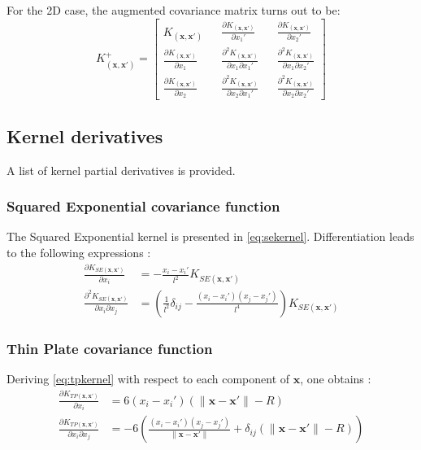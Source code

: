 \documentclass[10pt,a4paper,twocolumn]{article}
\begin{document}
For the 2D case, the augmented covariance matrix turns out to be:
\begin{equation}\label{eq:augm2Dkernel}
	K^+_{(\mathbf{x}, \mathbf{x'})} =
	\begin{bmatrix}
		K_{(\mathbf{x}, \mathbf{x'})} && \frac{\partial K_{(\mathbf{x}, \mathbf{x'})}}{\partial x_1'} && \frac{\partial K_{(\mathbf{x}, \mathbf{x'})}}{\partial x_2'} \\
		\frac{\partial K_{(\mathbf{x}, \mathbf{x'})}}{\partial x_1} && \frac{\partial^2 K_{(\mathbf{x}, \mathbf{x'})}}{\partial x_1 \partial x_1'} && \frac{\partial^2 K_{(\mathbf{x}, \mathbf{x'})}}{\partial x_1 \partial x_2'} \\
		\frac{\partial K_{(\mathbf{x}, \mathbf{x'})}}{\partial x_2} && \frac{\partial^2 K_{(\mathbf{x}, \mathbf{x'})}}{\partial x_2 \partial x_1'} && \frac{\partial^2 K_{(\mathbf{x}, \mathbf{x'})}}{\partial x_2 \partial x_2'}
	\end{bmatrix}
\end{equation}
\subsection{Kernel derivatives}
A list of kernel partial derivatives is provided.
\subsubsection{Squared Exponential covariance function}
The Squared Exponential kernel is presented in \autoref{eq:sekernel}. Differentiation leads to the following expressions \cite{martens_geometric_2017}:
\begin{align}
	\frac{\partial K_{SE(\mathbf{x}, \mathbf{x'})}}{\partial x_i} &= -\frac{x_i - x_i'}{l^2} K_{SE(\mathbf{x}, \mathbf{x'})} \\
	\frac{\partial^2 K_{SE(\mathbf{x}, \mathbf{x'})}}{\partial x_i \partial x_j} &= \left( \frac{1}{l^2} \delta_{ij} - \frac{(x_i - x_i')(x_j - x_j')}{l^4} \right) K_{SE(\mathbf{x}, \mathbf{x'})}
\end{align}

\subsubsection{Thin Plate covariance function}
Deriving \autoref{eq:tpkernel} with respect to each component of $\mathbf{x}$, one obtains \cite{martens_geometric_2017}:
\small
\begin{align}
	\frac{\partial K_{TP(\mathbf{x}, \mathbf{x'})}}{\partial x_i} &= 6(x_i - x_i') \left( \|\mathbf{x} - \mathbf{x'}\| - R \right) \\
	\frac{\partial K_{TP(\mathbf{x}, \mathbf{x'})}}{\partial x_i \partial x_j} &= -6 \left( \frac{(x_i - x_i')(x_j - x_j')}{\|\mathbf{x} - \mathbf{x'}\|} + \delta_{ij}(\|\mathbf{x} - \mathbf{x'}\| - R) \right)
\end{align}
\normalsize
\end{document}
